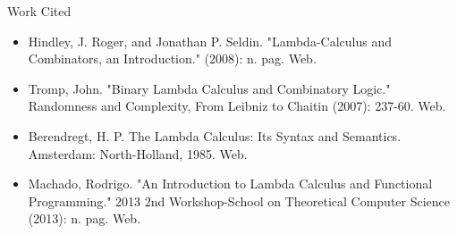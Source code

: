 \documentclass[12pt]{article}
\begin{document}
\begin{enumerate}
\begin{center}
Work Cited
\end{center}

\begin{itemize}
\item Hindley, J. Roger, and Jonathan P. Seldin. "Lambda-Calculus and Combinators, an Introduction." (2008): n. pag. Web.
\item Tromp, John. "Binary Lambda Calculus and Combinatory Logic." Randomness and Complexity, From Leibniz to Chaitin (2007): 237-60. Web.
\item Berendregt, H. P. The Lambda Calculus: Its Syntax and Semantics. Amsterdam: North-Holland, 1985. Web.
\item Machado, Rodrigo. "An Introduction to Lambda Calculus and Functional Programming." 2013 2nd Workshop-School on Theoretical Computer Science (2013): n. pag. Web.

\end{itemize}
\end{enumerate}
\end{document}
